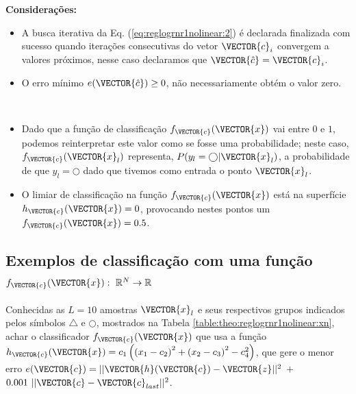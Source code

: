 \begin{theorem}
\textbf{Considerações:}
\begin{itemize}
\item A busca iterativa da Eq. (\ref{eq:reglogrnr1nolinear:2}) 
é declarada finalizada com sucesso 
quando iterações consecutivas do vetor $\VECTOR{c}_i$ convergem a valores próximos, 
nesse caso declaramos que $\VECTOR{\hat{c}}=\VECTOR{c}_i$.
\item O erro mínimo $e(\VECTOR{\hat{c}}) \geq 0$, não necessariamente obtém o valor zero. 
\end{itemize}
\end{theorem}
~

\begin{tcbattention}
\begin{itemize}
\item Dado que a função de classificação $f_{\VECTOR{c}}(\VECTOR{x})$ vai entre $0$ e $1$,
podemos reinterpretar este valor como se fosse uma probabilidade;
neste caso, $f_{\VECTOR{c}}(\VECTOR{x}_l)$ representa, $P(y_l=\bigcirc|\VECTOR{x}_l)$, 
a probabilidade de que $y_l=\bigcirc$ dado que tivemos como entrada o ponto $\VECTOR{x}_l$.
\item O limiar de classificação na função $f_{\VECTOR{c}}(\VECTOR{x})$ está na superfície $h_{\VECTOR{c}}(\VECTOR{x})=0$,
provocando nestes pontos um $f_{\VECTOR{c}}(\VECTOR{x})=0.5$.
\end{itemize}
\end{tcbattention}

\subsection{Exemplos de classificação com uma função
$f_{\VECTOR{c}}(\VECTOR{x}):~\mathbb{R}^N \rightarrow \mathbb{R}$ }

\begin{example}\label{ex:theo:reglogrnr1nolinear}
Conhecidas as $L=10$ amostras $\VECTOR{x}_l$ e seus respectivos 
grupos indicados pelos símbolos $\bigtriangleup$ e $\bigcirc$, 
mostrados na Tabela \ref{table:theo:reglogrnr1nolinear:xn},
achar o classificador $f_{\VECTOR{c}}(\VECTOR{x})$ que usa a função 
$h_{\VECTOR{c}}(\VECTOR{x})=c_1\left( \left(x_1-c_2\right)^2 + \left(x_2-c_3\right)^2 -c_4^2\right)$, 
que gere o menor erro $e(\VECTOR{c}) =  ||\VECTOR{h}(\VECTOR{c})-\VECTOR{z}||^2$ $+$ $0.001~||\VECTOR{c}-\VECTOR{c}_{last}||^2$.
\end{example}


